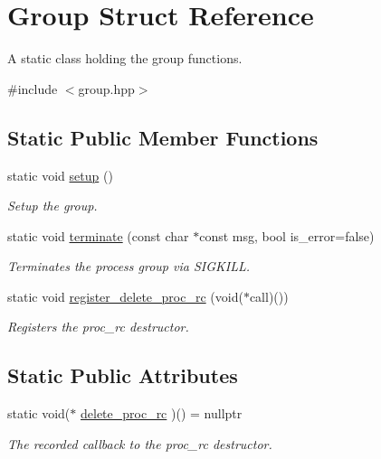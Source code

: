 \hypertarget{struct_group}{}\section{Group Struct Reference}
\label{struct_group}


A static class holding the group functions.  




{\ttfamily \#include $<$group.\+hpp$>$}

\subsection*{Static Public Member Functions}
\begin{DoxyCompactItemize}
\item 
static void \hyperlink{struct_group_a9e2d7e0c56696de4592f1b166188c10a}{setup} ()
\begin{DoxyCompactList}\small\item\em Setup the group. \end{DoxyCompactList}\item 
static void \hyperlink{struct_group_a8867a6d9f7987d3db83bf193bf42f858}{terminate} (const char $\ast$const msg, bool is\+\_\+error=false)
\begin{DoxyCompactList}\small\item\em Terminates the process group via S\+I\+G\+K\+I\+LL. \end{DoxyCompactList}\item 
static void \hyperlink{struct_group_a2db75d95407105dceb19a644750d001d}{register\+\_\+delete\+\_\+proc\+\_\+rc} (void($\ast$call)())
\begin{DoxyCompactList}\small\item\em Registers the proc\+\_\+rc destructor. \end{DoxyCompactList}\end{DoxyCompactItemize}
\subsection*{Static Public Attributes}
\begin{DoxyCompactItemize}
\item 
static void($\ast$ \hyperlink{struct_group_a737564dd9819ea8050f6f3019c550da2}{delete\+\_\+proc\+\_\+rc} )() = nullptr
\begin{DoxyCompactList}\small\item\em The recorded callback to the proc\+\_\+rc destructor. \end{DoxyCompactList}\end{DoxyCompactItemize}
